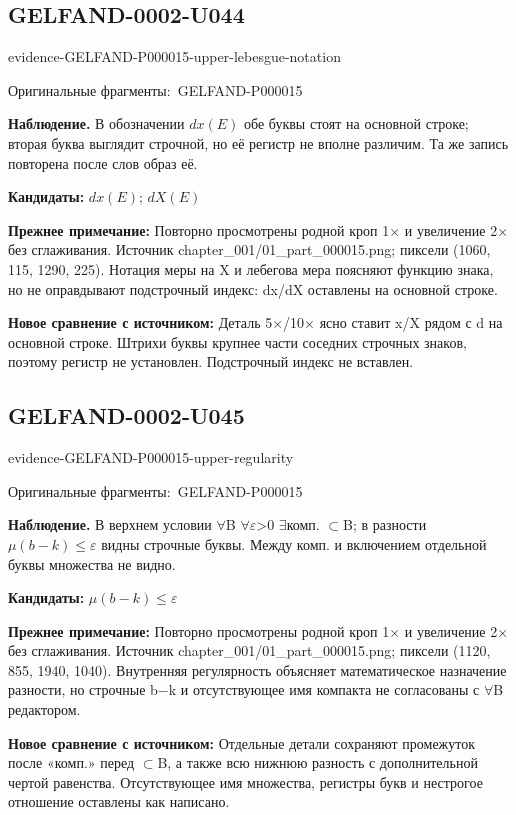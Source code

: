 \documentclass[11pt]{article}
\newcommand{\EvidenceBlock}[4]{%
 \par\smallskip\noindent\begin{minipage}{\linewidth}
 \begin{minipage}[t]{.47\linewidth}\vspace{0pt}\centering
 \csname evidence-#1-#2\endcsname\par
 {\scriptsize\SourceCropCaption\ #1}\par
 \end{minipage}\hfill
 \begin{minipage}[t]{.49\linewidth}\vspace{0pt}\raggedright
 {\small\color{orange!65!black}\textbf{#4} #3}\par
 \end{minipage}
 \end{minipage}\par\smallskip}
\newcommand{\SourceCropCaption}{Оригинальные фрагменты:}\newcommand{\ReadingCaption}{Сомнительное чтение.}\newcommand{\IncompleteCaption}{Неразобранный фрагмент.}\newcommand{\DiagramCaption}{Рисунок и набранное описание.}
\begin{document}
\subsection*{GELFAND-0002-U044}
\EvidenceBlock{GELFAND-P000015}{upper-lebesgue-notation}{В обозначении \(dx(E)\) обе буквы стоят на основной строке; вторая буква выглядит строчной, но её регистр не вполне различим. Та же запись повторена после слов образ её.}{Наблюдение.}
\par\smallskip\noindent\textbf{Кандидаты: } \(dx(E)\); \(dX(E)\)\par
\par\smallskip\noindent\textbf{Прежнее примечание: } Повторно просмотрены родной кроп 1× и увеличение 2× без сглаживания. Источник chapter\_001/01\_part\_000015.png; пиксели (1060, 115, 1290, 225). Нотация меры на X и лебегова мера поясняют функцию знака, но не оправдывают подстрочный индекс: dx/dX оставлены на основной строке.\par
\par\smallskip\noindent\textbf{Новое сравнение с источником: } Деталь 5×/10× ясно ставит x/X рядом с d на основной строке. Штрихи буквы крупнее части соседних строчных знаков, поэтому регистр не установлен. Подстрочный индекс не вставлен.\par

\subsection*{GELFAND-0002-U045}
\EvidenceBlock{GELFAND-P000015}{upper-regularity}{В верхнем условии \(\forall\)B \(\forall\)\(\varepsilon\)>0 \(\exists\)комп. \(\subset\)B; в разности \(\mu(b-k)\leq\varepsilon\) видны строчные буквы. Между комп. и включением отдельной буквы множества не видно.}{Наблюдение.}
\par\smallskip\noindent\textbf{Кандидаты: } \(\mu(b-k)\leq\varepsilon\)\par
\par\smallskip\noindent\textbf{Прежнее примечание: } Повторно просмотрены родной кроп 1× и увеличение 2× без сглаживания. Источник chapter\_001/01\_part\_000015.png; пиксели (1120, 855, 1940, 1040). Внутренняя регулярность объясняет математическое назначение разности, но строчные b−k и отсутствующее имя компакта не согласованы с \(\forall\)B редактором.\par
\par\smallskip\noindent\textbf{Новое сравнение с источником: } Отдельные детали сохраняют промежуток после «комп.» перед \(\subset\)B, а также всю нижнюю разность с дополнительной чертой равенства. Отсутствующее имя множества, регистры букв и нестрогое отношение оставлены как написано.\par
\end{document}
